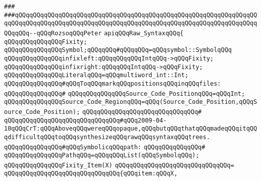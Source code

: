 \verb|###|\newline
\verb|###qQQqqQQqqQQqqQQqqQQqqQQqqQQqqQQqqQQqqQQqqQQqqQQqqQQqqQQqqQQqqQQqqQQqqQQqqQQqqQQqqQQqqQQqqQQqqQQqqQQqqQQqqQQqqQQqqQQqqQQqqQQqqQQqqQQqqQQqqQQqqQQq--qQQqRozsoqQQqPeter|\newline
\newline
\newline
\newline
\verb|apiqQQqRaw_SyntaxqQQq{|\newline
\newline
\verb|qQQqqQQqqQQqqQQqFixity;|\newline
\verb|qQQqqQQqqQQqqQQqSymbol;qQQqqQQq#qQQqqQQq=qQQqsymbol::SymbolqQQq|\newline
\newline
\verb|qQQqqQQqqQQqqQQqinfixleft:qQQqqQQqqQQqIntqQQq->qQQqFixity;|\newline
\verb|qQQqqQQqqQQqqQQqinfixright:qQQqqQQqIntqQQq->qQQqFixity;|\newline
\newline
\verb|qQQqqQQqqQQqqQQqLiteralqQQq=qQQqmultiword_int::Int;|\newline
\newline
\verb|qQQqqQQqqQQqqQQq#qQQqToqQQqmarkqQQqpositionsqQQqinqQQqfiles:|\newline
\verb|qQQqqQQqqQQqqQQq#|\newline
\verb|qQQqqQQqqQQqqQQqSource_Code_PositionqQQq=qQQqInt;|\newline
\verb|qQQqqQQqqQQqqQQqSource_Code_RegionqQQq=qQQq(Source_Code_Position,qQQqSource_Code_Position);|\newline
\verb|qQQqqQQqqQQqqQQqqQQqqQQqqQQqqQQq#|\newline
\verb|qQQqqQQqqQQqqQQqqQQqqQQqqQQqqQQq#qQQq2009-04-10qQQqCrT:qQQqAboveqQQqwereqQQqopaque,qQQqbutqQQqthatqQQqmadeqQQqitqQQqdifficultqQQqtoqQQqsynthesizeqQQqrawqQQqsyntaxqQQqtrees.|\newline
\newline
\verb|qQQqqQQqqQQqqQQq#qQQqSymbolicqQQqpath:|\newline
\verb|qQQqqQQqqQQqqQQq#|\newline
\verb|qQQqqQQqqQQqqQQqPathqQQq=qQQqqQQqList(qQQqSymbolqQQq);|\newline
\newline
\verb|qQQqqQQqqQQqqQQqFixity_Item(X)|\newline
\verb|qQQqqQQqqQQqqQQqqQQqqQQqqQQqqQQq=|\newline
\verb|qQQqqQQqqQQqqQQqqQQqqQQqqQQqqQQq{qQQqitem:qQQqX,|\newline
